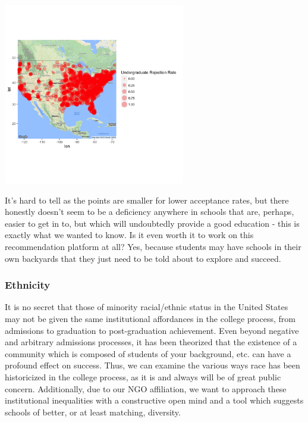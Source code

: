 \documentclass{article}\usepackage[]{graphicx}\usepackage[]{color}
\newenvironment{knitrout}{}{} %
\begin{document}
\begin{knitrout}
\color{fgcolor}

{\centering \includegraphics[width=300px]{../images/ggmap-admissionRateDistribution} 

}



\end{knitrout}

It's hard to tell as the points are smaller for lower acceptance rates, but there honestly doesn't seem to be a deficiency anywhere in schools that are, perhaps, easier to get in to, but which will undoubtedly provide a good education - this is exactly what we wanted to know. Is it even worth it to work on this recommendation platform at all? Yes, because students may have schools in their own backyards that they just need to be told about to explore and succeed. 

\subsubsection{Ethnicity}

It is no secret that those of minority racial/ethnic status in the United States may not be given the same institutional affordances in the college process, from admissions to graduation to post-graduation achievement. Even beyond negative and arbitrary admissions processes, it has been theorized that the existence of a community which is composed of students of your background, etc. can have a profound effect on success. Thus, we can examine the various ways race has been historicized in the college process, as it is and always will be of great public concern. Additionally, due to our NGO affiliation, we want to approach these institutional inequalities with a constructive open mind and a tool which suggests schools of better, or at least matching, diversity. 
\end{document}
